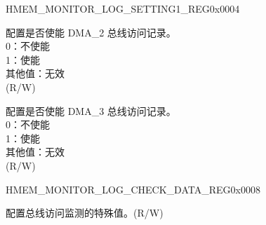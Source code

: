 \begin{register}{H}{MEM\_MONITOR\_LOG\_SETTING1\_REG}{0x0004}\label{regdesc:MEMMONITORLOGSETTING1REG}
%
%
%
\regnewline%
\begin{regdesc}\begin{reglist}
\label{fielddesc:MEMMONITORLOGDMA2ENA}\item [MEM\_MONITOR\_LOG\_DMA\_2\_ENA] 配置是否使能 DMA\_2 总线访问记录。\\
0：不使能\\
1：使能\\
其他值：无效\\
(R/W)
\label{fielddesc:MEMMONITORLOGDMA3ENA}\item [MEM\_MONITOR\_LOG\_DMA\_3\_ENA]配置是否使能 DMA\_3 总线访问记录。\\
0：不使能\\
1：使能\\
其他值：无效\\
(R/W)
\end{reglist}\end{regdesc}
\end{register}


\begin{register}{H}{MEM\_MONITOR\_LOG\_CHECK\_DATA\_REG}{0x0008}\label{regdesc:MEMMONITORLOGCHECKDATAREG}
%
\regnewline%
\begin{regdesc}\begin{reglist}
\label{fielddesc:MEMMONITORLOGCHECKDATA}\item [MEM\_MONITOR\_LOG\_CHECK\_DATA] 配置总线访问监测的特殊值。(R/W)
\end{reglist}\end{regdesc}
\end{register}


